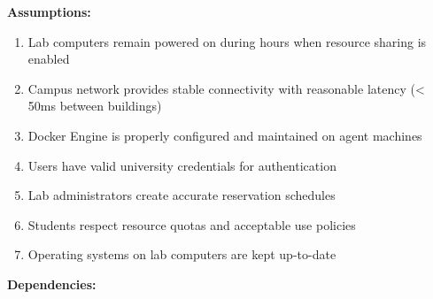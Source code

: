 \documentclass[12pt,a4paper]{article}
\begin{document}
\textbf{Assumptions:}

\begin{enumerate}
    \item Lab computers remain powered on during hours when resource sharing is enabled
    \item Campus network provides stable connectivity with reasonable latency (< 50ms between buildings)
    \item Docker Engine is properly configured and maintained on agent machines
    \item Users have valid university credentials for authentication
    \item Lab administrators create accurate reservation schedules
    \item Students respect resource quotas and acceptable use policies
    \item Operating systems on lab computers are kept up-to-date
\end{enumerate}
\textbf{Dependencies:}
\end{document}
